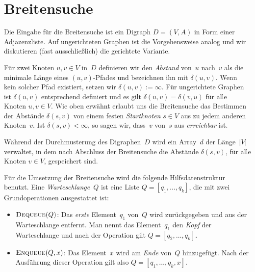 \section{Breitensuche}


\begin{bem}
Die Eingabe für die Breitensuche ist ein Digraph $D=(V,A)$ in Form einer Adjazenzliste.
Auf ungerichteten Graphen ist die Vorgehensweise analog und wir diskutieren (fast ausschließlich) die gerichtete Variante.
\end{bem}

\begin{defn}
Für zwei Knoten $u,v \in V$ in~$D$ definieren wir den \emph{Abstand} von~$u$ nach~$v$ als die minimale Länge eines $(u,v)$-Pfades und bezeichnen ihn mit $\delta(u,v)$.
Wenn kein solcher Pfad existiert, setzen wir $\delta(u,v):=\infty$.
Für ungerichtete Graphen ist $\delta(u,v)$ entsprechend definiert und es gilt $\delta(u,v)=\delta(v,u)$ für alle Knoten $u,v \in V$.
Wie oben erwähnt erlaubt uns die Breitensuche das Bestimmen der Abstände $\delta(s,v)$ von einem festen \emph{Startknoten} $s \in V$ aus zu jedem anderen Knoten~$v$.
Ist $\delta(s,v) < \infty$, so sagen wir, dass~$v$ von~$s$ aus \emph{erreichbar} ist.
\end{defn} 

\begin{bem} 
Während der Durchmusterung des Digraphen~$D$ wird ein Array~$d$ der Länge~$|V|$ verwaltet, in dem nach Abschluss der Breitensuche die Abstände $\delta(s,v)$, für alle Knoten $v \in V$, gespeichert sind.
\end{bem} 

\begin{defn} 
Für die Umsetzung der Breitensuche wird die folgende Hilfsdatenstruktur benutzt.
Eine \emph{Warteschlange}~$Q$ ist eine Liste $Q=[q_1,\ldots,q_k]$, die mit zwei Grundoperationen ausgestattet ist:
\begin{itemize}
 \item $\mathop{\text{\textsc{Dequeue}}}(Q)$: Das \emph{erste} Element~$q_1$ von~$Q$ wird zurückgegeben und aus der Warteschlange entfernt.
 Man nennt das Element~$q_1$ den \emph{Kopf} der Warteschlange und nach der Operation gilt $Q=[q_2,\ldots,q_k]$.

 \item $\mathop{\text{\textsc{Enqueue}}}(Q,x)$: Das Element~$x$ wird am \emph{Ende} von~$Q$ hinzugefügt.
 Nach der Ausführung dieser Operation gilt also $Q=[q_1,\ldots,q_k,x]$. 
\end{itemize}
\end{defn} 

